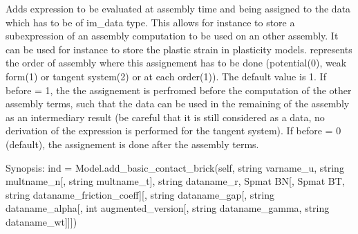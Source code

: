 \documentclass[a4paper,11pt,english]{sphinxmanual}
\begin{document}
\begin{fulllineitems}
\begin{fulllineitems}
Adds expression  to be evaluated at assembly time and being
assigned to the data  which has to be of im\_data type.
This allows for instance to store a sub\sphinxhyphen{}expression of an assembly
computation to be used on an other assembly. It can be used for instance
to store the plastic strain in plasticity models.
 represents the order of assembly where this assignement has to be
done (potential(0), weak form(1) or tangent system(2) or at each
order(\sphinxhyphen{}1)). The default value is 1.
If before = 1, the the assignement is perfromed before the computation
of the other assembly terms, such that the data can be used in the
remaining of the assembly as an intermediary result (be careful that it is
still considered as a data, no derivation of the expression is performed
for the tangent system).     
If before = 0 (default), the assignement is done after the assembly terms.

\end{fulllineitems}


\begin{fulllineitems}
\label{\detokenize{python/cmdref_Model:getfem.Model.add_basic_contact_brick}}
Synopsis: ind = Model.add\_basic\_contact\_brick(self, string varname\_u, string multname\_n{[}, string multname\_t{]}, string dataname\_r, Spmat BN{[}, Spmat BT, string dataname\_friction\_coeff{]}{[}, string dataname\_gap{[}, string dataname\_alpha{[}, int augmented\_version{[}, string dataname\_gamma, string dataname\_wt{]}{]}{]})


\end{fulllineitems}
\end{fulllineitems}
\end{document}

